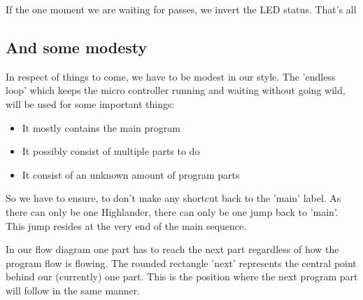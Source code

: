 If the one moment we are waiting for passes, we invert the LED status. That's all

\subsection{And some modesty}

In respect of things to come, we have to be modest in our style. The 'endless loop' which keeps the micro controller running and waiting without going wild, will be used for some important things:

\begin{itemize}
  \item It mostly contains the main program
  \item It possibly consist of multiple parts to do
  \item It consist of an unknown amount of program parts
\end{itemize}

So we have to ensure, to don't make any shortcut back to the 'main' label. As there can only be one Highlander, there can only be one jump back to 'main'. This jump resides at the very end of the main sequence.

In our flow diagram one part has to reach the next part regardless of how the program flow is flowing. The rounded rectangle 'next' represents the central point behind our (currently) one part. This is the position where the next program part will follow in the same manner.

